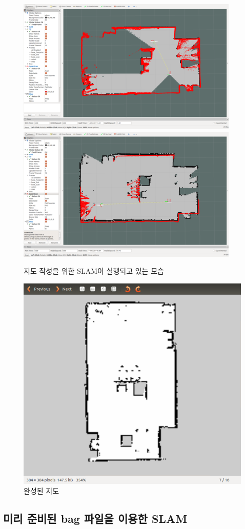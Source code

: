 \begin{figure}[h]
\centering
\includegraphics[width=0.5\columnwidth]{pictures/chapter11/slamtest1.png}
\includegraphics[width=0.5\columnwidth]{pictures/chapter11/slamtest2.png}
\caption{지도 작성을 위한 SLAM이 실행되고 있는 모습}
\end{figure}

\begin{figure}[h]
\centering
\includegraphics[width=0.7\columnwidth]{pictures/chapter11/slamtest_map.png}
\caption{완성된 지도}
\end{figure}

\subsection{미리 준비된 bag 파일을 이용한 SLAM}

